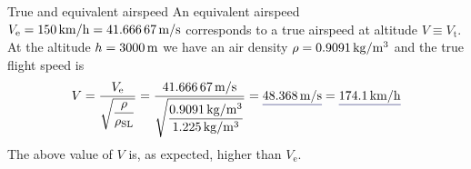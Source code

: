 \documentclass[[12pt,twoside]{book}
\begin{document}
%

%
\begin{myExampleX}{True and equivalent airspeed}{}%
\label{example:Equivalent:Airspeed:Basic:A}
%
\noindent
An equivalent airspeed
$V_\mathrm{e}
 =\SI[round-precision=0]{\myFlightSpeedEASKMH}{km/h}
 =\SI[round-precision=1]{\myFlightSpeedEASMTSec}{m/s}$
corresponds to a true airspeed at altitude $V\equiv V_\mathrm{t}$.
%
At the altitude $h=\SI[round-precision=0]{\myAltitudeMT}{m}$ we have an air density
$\rho=\SI[round-precision=3]{\myAirDensityKGMTcubed}{kg/m^3}$ and the
true flight speed is
\[
V = 
  \frac{ V_\text{e} }{ \sqrt{\dfrac{\rho}{\rho_\mathrm{SL}}} }
  = 
  \frac{
    \SI[round-precision=1]{\myFlightSpeedEASMTSec}{m/s}
  }{
    \sqrt{
      \dfrac{
        \SI[round-precision=3]{\myAirDensityKGMTcubed}{kg/m^3}
      }{
        \SI[round-precision=3]{\myISAAirDensitySeaLevelKGMTcubed}{kg/m^3}
      }
    }
  }
= 
  \mathunderline{mydarkblue}{ \SI[round-precision=1]{\myFlightSpeedMTSec}{\meter/\second} }
  = \mathunderline{mydarkblue}{ \SI[round-precision=1]{\myFlightSpeedKMH}{\kilo\meter/\hour} }
\]
%
The above value of $V$ is, as expected, higher than $V_\mathrm{e}$.

\end{myExampleX}
\end{document}
